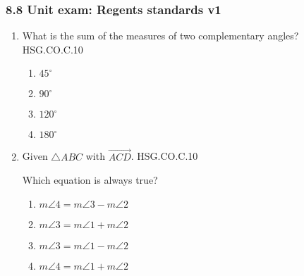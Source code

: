 

\fancyhead[LE]{\thepage}



\subsubsection*{8.8 Unit exam: Regents standards \hfill v1}
\begin{enumerate}
\item What is the sum of the measures of two complementary angles? \hfill HSG.CO.C.10
\begin{multicols}{2}
\begin{enumerate}
  \item $45^\circ$
  \item $90^\circ$
  \item $120^\circ$
  \item $180^\circ$
\end{enumerate}
\end{multicols}

\item Given $\triangle ABC$ with $\overrightarrow{ACD}$. \hfill HSG.CO.C.10
\begin{center}
\end{center}
Which equation is always true?
\begin{multicols}{2}
\begin{enumerate}
  \item $m\angle 4 = m\angle 3 - m\angle 2$
  \item $m\angle 3 = m\angle 1 + m\angle 2$
  \item $m\angle 3 = m\angle 1 - m\angle 2$
  \item $m\angle 4 = m\angle 1 + m\angle 2$
\end{enumerate}
\end{multicols}


\end{enumerate}
